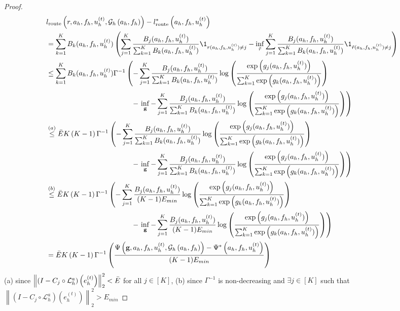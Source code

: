 \documentclass{article}
\begin{document}
\begin{proof}
\begin{align*}
    &l_{\text{route}}\left(r, a_h, f_h, u^{(t)}_h, \mathcal{G}_h\left(a_h, f_h\right)\right) - l_{\text{route}}^*\left(a_h, f_h, u^{(t)}_h\right) \\
    &= \sum_{k = 1}^K B_k(a_h, f_h, u^{(t)}_h)\left(\sum_{j = 1}^K \frac{B_j(a_h, f_h, u^{(t)}_h)}{\sum_{k = 1}^K B_k(a_h, f_h, u^{(t)}_h)}\1_{r(a_h, f_h, u^{(t)}_h) \neq j} - \inf_{\Tilde{r}} \sum_{j = 1}^K \frac{B_j(a_h, f_h, u^{(t)}_h)}{ \sum_{k = 1}^K B_k(a_h, f_h, u^{(t)}_h)}\1_{\tilde{r}(a_h, f_h, u^{(t)}_h) \neq j}\right) \\
    &\leq \sum_{k = 1}^K B_k(a_h, f_h, u^{(t)}_h)\Gamma^{-1}\left(-\sum_{j = 1}^K \frac{B_j(a_h, f_h, u^{(t)}_h)}{\sum_{k = 1}^K B_k(a_h, f_h, u^{(t)}_h)}\log\left(\frac{\exp\left(g_j(a_h, f_h, u^{(t)}_h)\right)}{\sum_{k = 1}^K\exp\left(g_k(a_h, f_h, u^{(t)}_h)\right)}\right) \right.\\&\quad\quad\quad\quad\quad\quad\quad\quad\quad\quad\quad\quad- \left.\inf_{\mathbf{g}} -\sum_{j = 1}^K \frac{B_j(a_h, f_h, u^{(t)}_h)}{\sum_{k = 1}^K B_k(a_h, f_h, u^{(t)}_h)}\log\left(\frac{\exp\left(g_j(a_h, f_h, u^{(t)}_h)\right)}{\sum_{k = 1}^K\exp\left(g_k(a_h, f_h, u^{(t)}_h)\right)}\right) \right) \\
    &\overset{(a)}{\leq} \Bar{E}K\left(K- 1\right)\Gamma^{-1}\left(-\sum_{j = 1}^K \frac{B_j(a_h, f_h, u^{(t)}_h)}{\sum_{k = 1}^K B_k(a_h, f_h, u^{(t)}_h)}\log\left(\frac{\exp\left(g_j(a_h, f_h, u^{(t)}_h)\right)}{\sum_{k = 1}^K\exp\left(g_k(a_h, f_h, u^{(t)}_h)\right)}\right) \right.\\&\quad\quad\quad\quad\quad\quad\quad\quad\quad\quad\quad\quad- \left.\inf_{\mathbf{g}} -\sum_{j = 1}^K \frac{B_j(a_h, f_h, u^{(t)}_h)}{\sum_{k = 1}^K B_k(a_h, f_h, u^{(t)}_h)}\log\left(\frac{\exp\left(g_j(a_h, f_h, u^{(t)}_h)\right)}{\sum_{k = 1}^K\exp\left(g_k(a_h, f_h, u^{(t)}_h)\right)}\right) \right) \\
    &\overset{(b)}{\leq} \Bar{E}K\left(K- 1\right)\Gamma^{-1}\left(-\sum_{j = 1}^K \frac{B_j(a_h, f_h, u^{(t)}_h)}{(K - 1)E_{min}}\log\left(\frac{\exp\left(g_j(a_h, f_h, u^{(t)}_h)\right)}{\sum_{k = 1}^K\exp\left(g_k(a_h, f_h, u^{(t)}_h)\right)}\right) \right.\\&\quad\quad\quad\quad\quad\quad\quad\quad\quad\quad\quad\quad- \left.\inf_{\mathbf{g}} -\sum_{j = 1}^K \frac{B_j(a_h, f_h, u^{(t)}_h)}{(K - 1)E_{min}}\log\left(\frac{\exp\left(g_j(a_h, f_h, u^{(t)}_h)\right)}{\sum_{k = 1}^K\exp\left(g_k(a_h, f_h, u^{(t)}_h)\right)}\right) \right) \\
    &= \Bar{E}K\left(K- 1\right)\Gamma^{-1}\left(\frac{\Psi\left(\mathbf{g}, a_h, f_h, u^{(t)}_h, \mathcal{G}_h\left(a_h, f_h\right)\right)- \Psi^*\left(a_h, f_h, u^{(t)}_h\right)}{(K - 1)E_{min}} \right)
\end{align*}
(a) since $\left\|\left( I - C_{j} \circ \mathcal{L}_{h}^a\right)\left(e^{(t)}_h\right)\right\|^2_2 < \Bar{E}$ for all $j \in [K]$, (b) since $\Gamma^{-1}$ is non-decreasing and $\exists j \in [K]$ such that $\left\|\left( I - C_{j} \circ \mathcal{L}_{h}^a\right)\left(e^{(t)}_h\right)\right\|^2_2 > E_{min}$


\end{proof}
\end{document}
